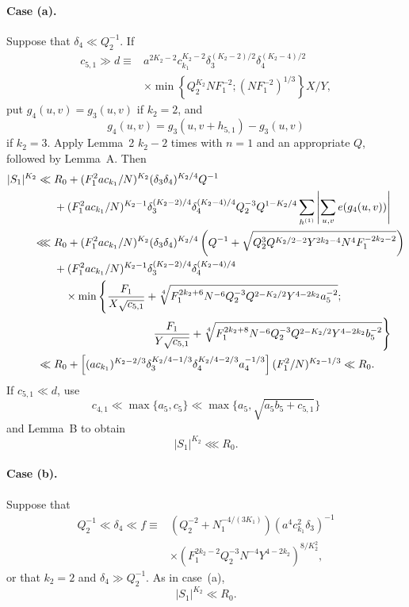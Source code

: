 \documentclass[10pt]{article}
\begin{document}
\paragraph{Case (a).}
Suppose that $\delta_4\ll Q_2^{-1}$. If
\[
\begin{aligned}
  c_{5,1}\gg d\equiv{}&
  a^{2K_2-2}c_{k_1}^{K_2-2}
  \delta_3^{(K_2-2)/2}\delta_4^{(K_2-4)/2}\\
  &\times\min\left\{Q_2^{K_2}NF_1^{-2};(NF_1^{-2})^{1/3}\right\}X/Y,
\end{aligned}
\]
put $g_4(u,v)=g_3(u,v)$ if $k_2=2$, and
\[
  g_4(u,v)=g_3(u,v+h_{5,1})-g_3(u,v)
\]
if $k_2=3$. Apply Lemma~2 $k_2-2$ times with $n=1$ and an appropriate $Q$, followed by Lemma~A. Then
\[
\begin{aligned}
  |S_1|^{K_2}
  \ll{}&R_0+
  (F_1^2ac_{k_1}/N)^{K_2}(\delta_3\delta_4)^{K_2/4}Q^{-1}\\
  &+(F_1^2ac_{k_1}/N)^{K_2-1}
  \delta_3^{(K_2-2)/4}\delta_4^{(K_2-4)/4}
  Q_2^{-3}Q^{1-K_2/4}
  \sum_{h^{(1)}}\left|\sum_{u,v}e(g_4(u,v))\right|\\
  \lll{}&R_0+
  (F_1^2ac_{k_1}/N)^{K_2}(\delta_3\delta_4)^{K_2/4}
  \left(Q^{-1}+\sqrt{Q_2^3Q^{K_2/2-2}Y^{2k_2-4}N^4F_1^{-2k_2-2}}\right)\\
  &+(F_1^2ac_{k_1}/N)^{K_2-1}
  \delta_3^{(K_2-2)/4}\delta_4^{(K_2-4)/4}\\
  &\quad\times\min\Bigg\{
  \frac{F_1}{X\sqrt{c_{5,1}}}
  +\sqrt[4]{F_1^{2k_2+6}N^{-6}Q_2^{-3}Q^{2-K_2/2}Y^{4-2k_2}a_5^{-2}};\\
  &\hspace{32mm}
  \frac{F_1}{Y\sqrt{c_{5,1}}}
  +\sqrt[4]{F_1^{2k_2+8}N^{-6}Q_2^{-3}Q^{2-K_2/2}Y^{4-2k_2}b_5^{-2}}
  \Bigg\}\\
  \ll{}&R_0+
  \left[(ac_{k_1})^{K_2-2/3}
    \delta_3^{K_2/4-1/3}\delta_4^{K_2/4-2/3}a_4^{-1/3}\right]
  (F_1^2/N)^{K_2-1/3}
  \ll R_0.
\end{aligned}
\]
If $c_{5,1}\ll d$, use
\[
  c_{4,1}\ll\max\{a_5,c_5\}
  \ll\max\{a_5,\sqrt{a_5b_5+c_{5,1}}\}
\]
and Lemma~B to obtain
\[
  |S_1|^{K_2}\lll R_0.
\]

\paragraph{Case (b).}
Suppose that
\[
\begin{aligned}
  Q_2^{-1}\ll\delta_4\ll f\equiv{}&
  \left(Q_2^{-2}+N_1^{-4/(3K_1)}\right)
  (a^4c_{k_1}^2\delta_3)^{-1}\\
  &\times\left(F_1^{2k_2-2}Q_2^{-3}N^{-4}Y^{4-2k_2}\right)^{8/K_2^2},
\end{aligned}
\]
or that $k_2=2$ and $\delta_4\gg Q_2^{-1}$. As in case~(a),
\[
  |S_1|^{K_2}\ll R_0.
\]
\end{document}

